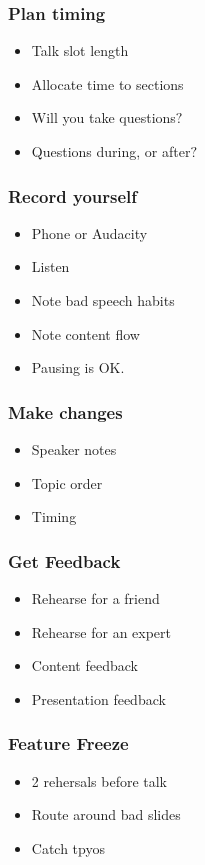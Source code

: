 \documentclass{beamer}
\begin{document}
\begin{frame}[fragile]
\tableofcontents[currentsection]
\end{frame}

\begin{frame}[fragile]
\frametitle{Plan timing}
\begin{itemize}[<+(1)->]
\item Talk slot length
\item Allocate time to sections
\item Will you take questions$?$
\item Questions during, or after$?$
\end{itemize}
\end{frame}

\begin{frame}[fragile]
\frametitle{Record yourself}
\begin{itemize}[<+(1)->]
\item Phone or Audacity
\item Listen
\item Note bad speech habits
\item Note content flow
\item Pausing is OK.
\end{itemize}
\end{frame}

\begin{frame}[fragile]
\frametitle{Make changes}
\begin{itemize}[<+(1)->]
\item Speaker notes
\item Topic order
\item Timing
\end{itemize}
\end{frame}

\begin{frame}[fragile]
\frametitle{Get Feedback}
\begin{itemize}[<+(1)->]
\item Rehearse for a friend
\item Rehearse for an expert
\item Content feedback
\item Presentation feedback
\end{itemize}
\end{frame}

\begin{frame}[fragile]
\frametitle{Feature Freeze}
\begin{itemize}[<+(1)->]
\item 2 rehersals before talk
\item Route around bad slides
\item Catch tpyos
\end{itemize}
\end{frame}
\end{document}
